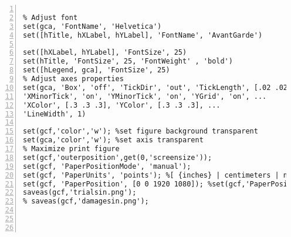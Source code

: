 \begin{lstlisting}[numbers=left, numberstyle=\tiny, keywordstyle=\color{blue!100}, commentstyle=\color{red!30!green!100!blue!100}, frame=shadowbox, rulesepcolor=\color{red!20!green!20!blue!20}]
% hTitle = title('Difference between cyclic load calculation and numerical method as function of time(time step=1/15000)' ,'Fontsize' ,30);

% Adjust font
set(gca, 'FontName', 'Helvetica')
set([hTitle, hXLabel, hYLabel], 'FontName', 'AvantGarde')

set([hXLabel, hYLabel], 'FontSize', 25)
set(hTitle, 'FontSize', 25, 'FontWeight' , 'bold')
set([hLegend, gca], 'FontSize', 25)
% Adjust axes properties
set(gca, 'Box', 'off', 'TickDir', 'out', 'TickLength', [.02 .02], ...
'XMinorTick', 'on', 'YMinorTick', 'on', 'YGrid', 'on', ...
'XColor', [.3 .3 .3], 'YColor', [.3 .3 .3], ...
'LineWidth', 1)

set(gcf,'color','w'); %set figure background transparent
set(gca,'color','w'); %set axis transparent
% Maximize print figure
set(gcf,'outerposition',get(0,'screensize'));
set(gcf, 'PaperPositionMode', 'manual');
set(gcf, 'PaperUnits', 'points'); %[ {inches} | centimeters | normalized | points ]
set(gcf, 'PaperPosition', [0 0 1920 1080]); %set(gcf,'PaperPosition',[left,bottom,width,height])
saveas(gcf,'trialsin.png');
% saveas(gcf,'damagesin.png');




\end{lstlisting}
